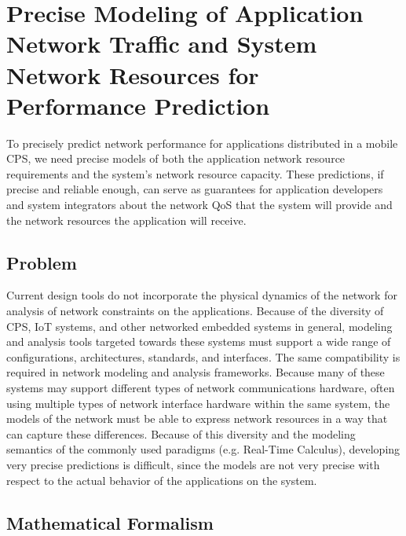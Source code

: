 \section{Precise Modeling of Application Network Traffic and System Network Resources for Performance Prediction}
\label{sec:framework} 

To precisely predict network performance for applications distributed
in a mobile CPS, we need precise models of both the application
network resource requirements and the system's network resource
capacity.  These predictions, if precise and reliable enough, can
serve as guarantees for application developers and system integrators
about the network QoS that the system will provide and the network
resources the application will receive.

\subsection{Problem}
Current design tools do not incorporate the physical dynamics of the
network for analysis of network constraints on the
applications. Because of the diversity of CPS, IoT systems, and other
networked embedded systems in general, modeling and analysis tools
targeted towards these systems must support a wide range of
configurations, architectures, standards, and interfaces.  The same
compatibility is required in network modeling and analysis frameworks.
Because many of these systems may support different types of network
communications hardware, often using multiple types of network
interface hardware within the same system, the models of the network
must be able to express network resources in a way that can capture
these differences.  Because of this diversity and the modeling
semantics of the commonly used paradigms (e.g. Real-Time Calculus),
developing very precise predictions is difficult, since the models are
not very precise with respect to the actual behavior of the
applications on the system.

\subsection{Mathematical Formalism}
\label{subsec:math_formalism}

